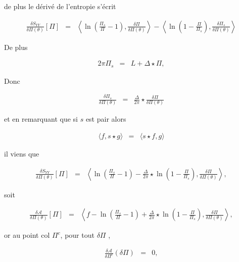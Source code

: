 de plus le dérivé de l'entropie s'écrit

\begin{eqnarray}
	\frac{ \delta S_{YY} }{ \delta \Pi(\theta)  } [\Pi ] & = & \left \langle \ln \left ( \frac{ \Pi_s}{\Pi} -1 \right ) , \frac{\delta \Pi }{\delta \Pi (\theta) } \right \rangle - 	\left \langle \ln \left ( 1 - \frac{\Pi}{\Pi_s} \right ) , \frac{\delta \Pi_s }{\delta \Pi (\theta) } \right \rangle \label{eq.entropie2}	
\end{eqnarray}

De plus 

\begin{eqnarray*}
	2\pi \Pi_s &= & L + \Delta \star \Pi , 	
\end{eqnarray*}

Donc 

\begin{eqnarray}
	\frac{\delta \Pi_s}{\delta \Pi (\theta) } & = & \frac{\Delta}{2\pi} \star \frac{\delta \Pi}{\delta \Pi (\theta) } \label{eq.Pis_prime}
\end{eqnarray}

et en remarquant que si $s$ est pair alors

\begin{eqnarray*}
	\langle f , s \star g \rangle & = & \langle s \star f  ,  g  \rangle	
\end{eqnarray*}

il viens que 

\begin{eqnarray}
	\frac{ \delta S_{YY} }{ \delta \Pi(\theta)  } [\Pi ] & = & \left \langle \ln \left ( \frac{ \Pi_s}{\Pi} -1 \right )  - \frac{\Delta}{2\pi} \star  \ln \left ( 1 - \frac{\Pi}{\Pi_s} \right ) , \frac{\delta \Pi }{\delta \Pi (\theta) } \right \rangle, \label{eq.entropie3} 	
\end{eqnarray}

soit

\begin{eqnarray}
	\frac{\delta \mathcal{A}}{\delta \Pi(\theta) }[\Pi] & = & \left \langle f - \ln \left ( \frac{ \Pi_s}{\Pi} -1 \right )  + \frac{\Delta}{2\pi} \star  \ln \left ( 1 - \frac{\Pi}{\Pi_s} \right ) , \frac{\delta \Pi }{\delta \Pi (\theta) } \right \rangle, \label{eq.action2} 
\end{eqnarray} 

or au point col $\Pi^c$, pour tout $\delta \Pi$ , 

\begin{eqnarray*}
	\frac{ \delta \mathcal{A}}{\delta \Pi^c}(\delta \Pi) & = & 0,
\end{eqnarray*}

